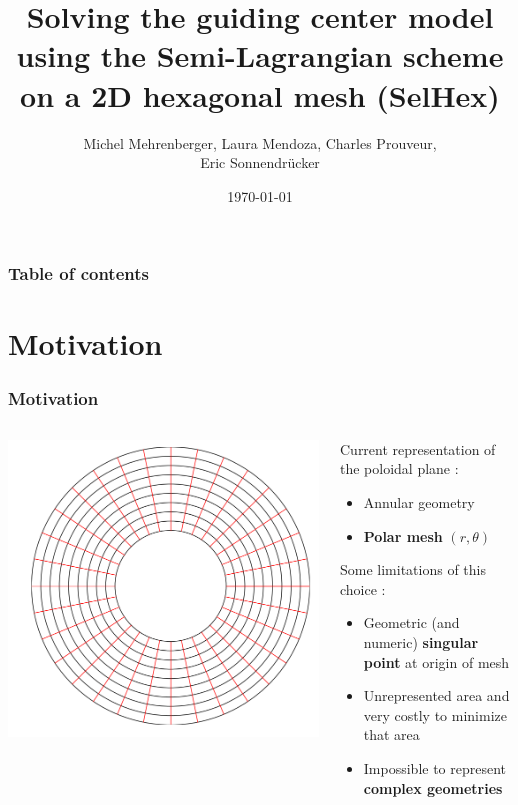\documentclass[]{beamer}
\title{Solving the guiding center model using the Semi-Lagrangian scheme on a 2D hexagonal mesh (SelHex)}
\author{Michel Mehrenberger, Laura Mendoza, Charles Prouveur,\\ Eric Sonnendr\"{u}cker}
\institute[SelHex (CEMRACS 2014)]
{
}\date{\today}
\begin{document}
\begin{frame}
\titlepage
\end{frame} 


\begin{frame}
\frametitle{Table of contents}
\tableofcontents
\end{frame} 


\section{Motivation} 


\begin{frame}
	\frametitle{Motivation}
	\begin{columns}
    	\begin{column}{0.45\textwidth}
    		\includegraphics[width=1.0\textwidth]{mapping.png}
    	\end{column}
    	\begin{column}{0.5\textwidth}
    		Current representation of the poloidal plane :
    		\begin{itemize}
    	    		\item Annular geometry
    			\item \textbf{Polar mesh} $(r, \theta)$
   		 \end{itemize}
   	 	Some limitations of this choice :
    		\begin{itemize}
    			\item{Geometric (and numeric)  \textbf{singular point} at origin of mesh}
    			\item{Unrepresented area and very costly to minimize that area}
    			\item{Impossible to represent \textbf{complex geometries} }
    		\end{itemize}
    	\end{column}
	\end{columns}
\end{frame}
\end{document}
